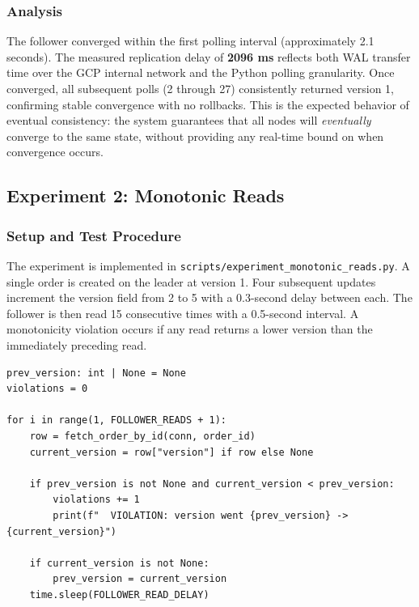 \documentclass[12pt,a4paper]{article}
\begin{document}
\subsubsection{Analysis}

The follower converged within the first polling interval (approximately 2.1 seconds).
The measured replication delay of \textbf{2096 ms} reflects both WAL transfer time
over the GCP internal network and the Python polling granularity. Once converged,
all subsequent polls (2 through 27) consistently returned version 1, confirming
stable convergence with no rollbacks. This is the expected behavior of eventual
consistency: the system guarantees that all nodes will \textit{eventually} converge
to the same state, without providing any real-time bound on when convergence occurs.

\subsection{Experiment 2: Monotonic Reads}

\subsubsection{Setup and Test Procedure}

The experiment is implemented in \texttt{scripts/experiment\_monotonic\_reads.py}.
A single order is created on the leader at version 1. Four subsequent updates
increment the version field from 2 to 5 with a 0.3-second delay between each.
The follower is then read 15 consecutive times with a 0.5-second interval.
A monotonicity violation occurs if any read returns a lower version than the
immediately preceding read.

\begin{lstlisting}[style=pythonstyle, caption={Monotonicity check -- Experiment 2}]
prev_version: int | None = None
violations = 0

for i in range(1, FOLLOWER_READS + 1):
    row = fetch_order_by_id(conn, order_id)
    current_version = row["version"] if row else None

    if prev_version is not None and current_version < prev_version:
        violations += 1
        print(f"  VIOLATION: version went {prev_version} -> {current_version}")

    if current_version is not None:
        prev_version = current_version
    time.sleep(FOLLOWER_READ_DELAY)
\end{lstlisting}
\end{document}

